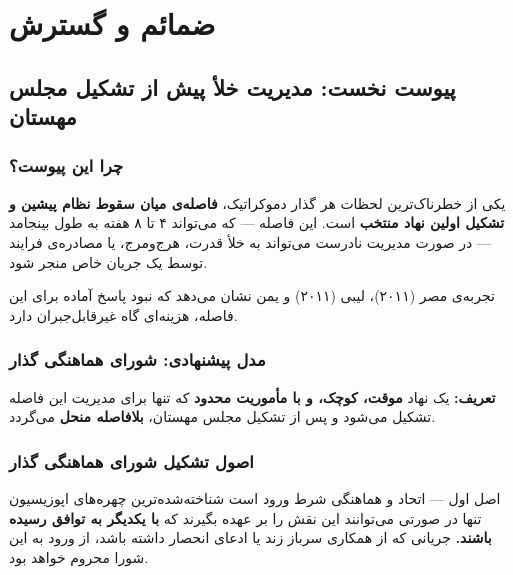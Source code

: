 \part{ضمائم و گسترش}
\label{part:appendices}

\chapter{پیوست نخست: مدیریت خلأ پیش از تشکیل مجلس مهستان}
\label{app:preassembly}

\section*{چرا این پیوست؟}

یکی از خطرناک‌ترین لحظات هر گذار دموکراتیک، \textbf{فاصله‌ی میان سقوط نظام پیشین
و تشکیل اولین نهاد منتخب} است. این فاصله --- که می‌تواند ۴ تا ۸ هفته به طول
بینجامد --- در صورت مدیریت نادرست می‌تواند به خلأ قدرت، هرج‌ومرج، یا مصادره‌ی
فرایند توسط یک جریان خاص منجر شود.

تجربه‌ی مصر (۲۰۱۱)، لیبی (۲۰۱۱) و یمن نشان می‌دهد که نبود پاسخ آماده برای این
فاصله، هزینه‌ای گاه غیرقابل‌جبران دارد.

\section*{مدل پیشنهادی: شورای هماهنگی گذار}

\begin{dangerbox}
\textbf{تعریف:} یک نهاد \textbf{موقت، کوچک، و با مأموریت محدود} که تنها برای مدیریت
این فاصله تشکیل می‌شود و پس از تشکیل مجلس مهستان، \textbf{بلافاصله منحل} می‌گردد.
\end{dangerbox}

\section*{اصول تشکیل شورای هماهنگی گذار}

\begin{bandbox}{اصل اول --- اتحاد و هماهنگی شرط ورود است}
شناخته‌شده‌ترین چهره‌های اپوزیسیون تنها در صورتی می‌توانند این نقش را بر عهده
بگیرند که \textbf{با یکدیگر به توافق رسیده باشند.} جریانی که از همکاری سرباز زند
یا ادعای انحصار داشته باشد، از ورود به این شورا محروم خواهد بود.
\end{bandbox}

